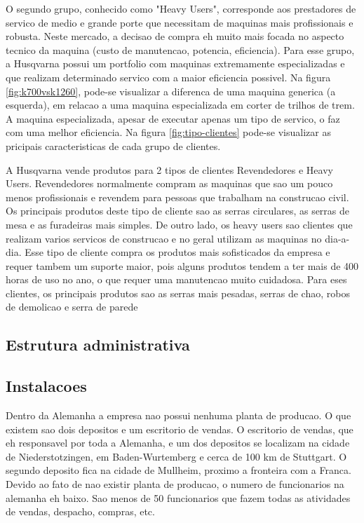 \documentclass[12pt]{article}
\begin{document}
	O segundo grupo, conhecido como "Heavy Users", corresponde aos prestadores de servico de medio e grande porte que necessitam de maquinas mais profissionais e robusta. Neste mercado, a decisao de compra eh muito mais focada no aspecto tecnico da maquina (custo de manutencao, potencia, eficiencia). Para esse grupo, a Husqvarna possui um portfolio com maquinas extremamente especializadas e que realizam determinado servico com a maior eficiencia possivel. Na figura \ref{fig:k700vsk1260}, pode-se visualizar a diferenca de uma maquina generica (a esquerda), em relacao a uma maquina especializada em corter de trilhos de trem. A maquina especializada, apesar de executar apenas um tipo de servico, o faz com uma melhor eficiencia. Na figura \ref{fig:tipo-clientes} pode-se visualizar as pricipais caracteristicas de cada grupo de clientes.
	


A Husqvarna vende produtos para 2 tipos de clientes Revendedores e Heavy Users. Revendedores normalmente compram as maquinas que sao um pouco menos profissionais e revendem para pessoas que trabalham na construcao civil. Os principais produtos deste tipo de cliente sao as serras circulares, as serras de mesa e as furadeiras mais simples. De outro lado, os heavy users sao clientes que realizam varios servicos de construcao e no geral utilizam as maquinas no dia-a-dia. Esse tipo de cliente compra os produtos mais sofisticados da empresa e requer tambem um suporte maior, pois alguns produtos tendem a ter mais de 400 horas de uso no ano, o que requer uma manutencao muito cuidadosa. Para eses clientes, os principais produtos sao as serras mais pesadas, serras de chao, robos de demolicao e serra de parede

\subsection{Estrutura administrativa}


\subsection{Instalacoes}
Dentro da Alemanha a empresa nao possui nenhuma planta de producao. O que existem sao dois depositos e um escritorio de vendas. O escritorio de vendas, que eh responsavel por toda a Alemanha, e um dos depositos se localizam na cidade de Niederstotzingen, em Baden-Wurtemberg e cerca de 100 km de Stuttgart. O segundo deposito fica na cidade de Mullheim, proximo a fronteira com a Franca.
Devido ao fato de nao existir planta de producao, o numero de funcionarios na alemanha eh baixo. Sao menos de 50 funcionarios que fazem todas as atividades de vendas, despacho, compras, etc.
\end{document}
